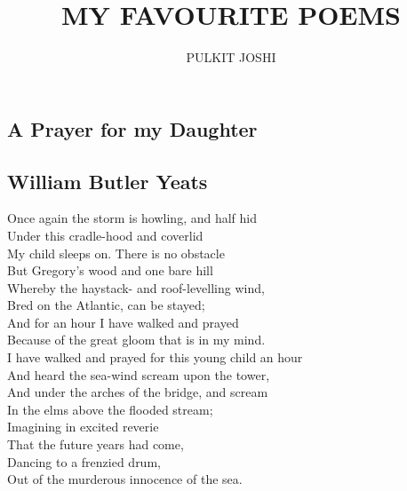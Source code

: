 \documentclass[a4,12pt]{article}
\title{\textbf{MY FAVOURITE POEMS}}
\author{PULKIT JOSHI}
\date{}
\begin{document}
    \maketitle
    \begin{center}
    \newpage
    \tableofcontents
    
        

        \newpage
        \section*{A Prayer for my Daughter}
        \label{sec:A Prayer for my Daughter}
        \subsection*{William Butler Yeats}

        \vspace{15pt}
        Once again the storm is howling, and half hid\\
        Under this cradle-hood and coverlid\\
        My child sleeps on. There is no obstacle\\
        But Gregory's wood and one bare hill\\
        Whereby the haystack- and roof-levelling wind,\\
        Bred on the Atlantic, can be stayed;\\
        And for an hour I have walked and prayed\\
        Because of the great gloom that is in my mind.\\
        
        \vspace{15pt}
        I have walked and prayed for this young child an hour\\
        And heard the sea-wind scream upon the tower,\\
        And under the arches of the bridge, and scream\\
        In the elms above the flooded stream;\\
        Imagining in excited reverie\\
        That the future years had come,\\
        Dancing to a frenzied drum,\\
        Out of the murderous innocence of the sea.\\
       

\end{center}
\end{document}
